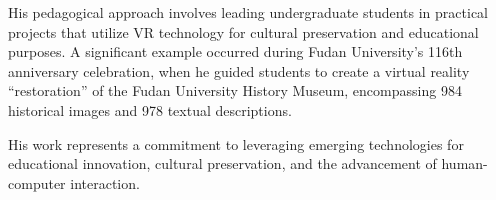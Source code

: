 \documentclass[11pt,a4paper,openright]{book}
\begin{document}
His pedagogical approach involves leading undergraduate students in practical projects that utilize VR technology for cultural preservation and educational purposes. A significant example occurred during Fudan University's 116th anniversary celebration, when he guided students to create a virtual reality ``restoration'' of the Fudan University History Museum, encompassing 984 historical images and 978 textual descriptions.

His work represents a commitment to leveraging emerging technologies for educational innovation, cultural preservation, and the advancement of human-computer interaction.

\tableofcontents

\mainmatter













\appendix






\backmatter



\printglossary[type=\acronymtype,title=List of Acronyms]
\printglossary[title=Glossary]

\printindex
\end{document}

